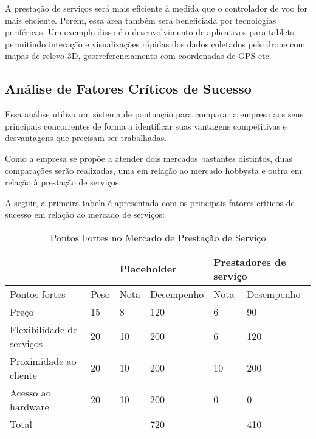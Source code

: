 A prestação de serviços será mais eficiente à medida que o controlador de voo for mais eficiente. Porém, 
essa área também será beneficiada por tecnologias periféricas. Um exemplo disso é o desenvolvimento de 
aplicativos para tablets, permitindo interação e visualizações rápidas dos dados coletados pelo drone com 
mapas de relevo 3D, georreferenciamento com coordenadas de GPS etc.

\subsection{Análise de Fatores Críticos de Sucesso}

Essa análise utiliza um sistema de pontuação para comparar a empresa aos seus principais concorrentes de 
forma a identificar suas vantagens competitivas e desvantagens que precisam ser trabalhadas.

Como a empresa se propõe a atender dois mercados bastantes distintos, duas comparações serão realizadas, 
uma em relação ao mercado hobbysta e outra em relação à prestação de serviços.

A seguir, a primeira tabela é apresentada com os principais fatores críticos de sucesso em relação ao 
mercado de serviços:

\begin{table}[!htbp]
	\centering
	\begin{tabular}{ll|l|l|l|l|}
		\cline{3-6}
		&      & \multicolumn{2}{l|}{Placeholder} & \multicolumn{2}{l|}{Prestadores de serviço} \\ \hline
		\multicolumn{1}{|l|}{Pontos fortes}             & Peso & Nota         & Desempenho        & Nota              & Desempenho              \\ \hline
		\multicolumn{1}{|l|}{Preço}                     & 15   & 8            & 120               & 6                 & 90                      \\ \hline
		\multicolumn{1}{|l|}{Flexibilidade de serviços} & 20   & 10           & 200               & 6                 & 120                     \\ \hline
		\multicolumn{1}{|l|}{Proximidade ao cliente}    & 20   & 10           & 200               & 10                & 200                     \\ \hline
		\multicolumn{1}{|l|}{Acesso ao hardware}        & 20   & 10           & 200               & 0                 & 0                       \\ \hline
		\multicolumn{1}{|l|}{Total}                     &      &              & 720               &                   & 410                     \\ \hline
	\end{tabular}
	\label{pontoForteServico}
	\caption{Pontos Fortes no Mercado de Prestação de Serviço}
\end{table}


